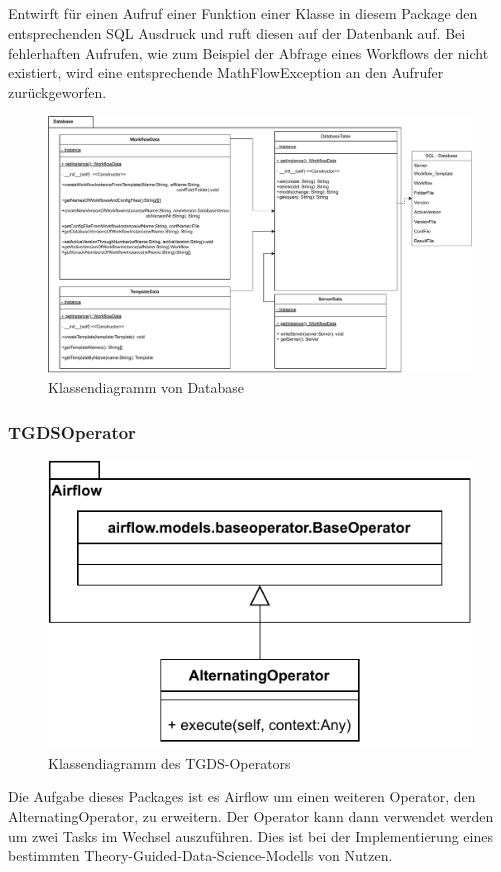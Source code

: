 \subsection{}
Entwirft für einen Aufruf einer Funktion einer Klasse in diesem Package den entsprechenden SQL Ausdruck und ruft diesen auf der Datenbank auf.
Bei fehlerhaften Aufrufen, wie zum Beispiel der Abfrage eines Workflows der nicht existiert, wird eine entsprechende MathFlowException an den Aufrufer zurückgeworfen.
\begin{figure}[h]
	\centering
	\includegraphics[width=1\textwidth]{res/Database_Package.pdf} 
	\caption{Klassendiagramm von Database}
	\label{fig:database_package}
\end{figure}


\subsubsection{TGDSOperator}
\begin{figure}[H]
    \includegraphics[width=1\textwidth]{res/Klassen/tgdsOp.pdf}
    \caption{Klassendiagramm des TGDS-Operators}
\end{figure}
Die Aufgabe dieses Packages ist es Airflow um einen weiteren Operator, den AlternatingOperator, zu erweitern.
Der Operator kann dann verwendet werden um zwei Tasks im Wechsel auszuführen. 
Dies ist bei der Implementierung eines bestimmten Theory-Guided-Data-Science-Modells von Nutzen. 


